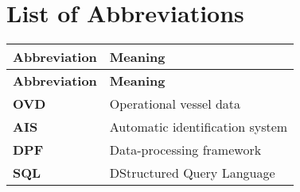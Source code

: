 \chapter*{List of Abbreviations}

\begin{longtable}[c]{>{\bfseries}p{3cm} p{11.9cm}}
	Abbreviation & \textbf{Meaning} \\[3ex]
	\endfirsthead
	Abbreviation & \textbf{Meaning} \\[3ex]
	\endhead
	OVD&Operational vessel data \\[2mm]
	AIS&Automatic identification system\\[2mm]
	DPF&Data-processing framework\\[2mm]
    SQL&DStructured Query Language\\[2mm]
\end{longtable}